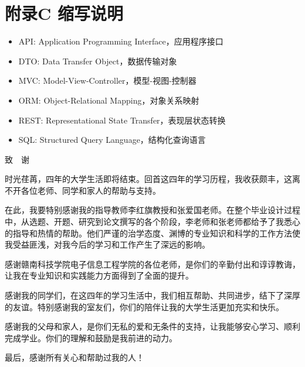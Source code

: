 \documentclass[a4paper,12pt,openany,twoside]{ctexbook}
\begin{document}
\section*{附录C 缩写说明}

\begin{itemize}[leftmargin=2em,itemsep=0pt]
    \item API: Application Programming Interface，应用程序接口
    \item DTO: Data Transfer Object，数据传输对象
    \item MVC: Model-View-Controller，模型-视图-控制器
    \item ORM: Object-Relational Mapping，对象关系映射
    \item REST: Representational State Transfer，表现层状态转换
    \item SQL: Structured Query Language，结构化查询语言
\end{itemize}


\clearpage
{}
{}

\begin{center}
    {\heiti{}致~~谢}
\end{center}

时光荏苒，四年的大学生活即将结束。回首这四年的学习历程，我收获颇丰，这离不开各位老师、同学和家人的帮助与支持。

在此，我要特别感谢我的指导教师李红旗教授和张爱国老师。在整个毕业设计过程中，从选题、开题、研究到论文撰写的各个阶段，李老师和张老师都给予了我悉心的指导和热情的帮助。他们严谨的治学态度、渊博的专业知识和科学的工作方法使我受益匪浅，对我今后的学习和工作产生了深远的影响。

感谢赣南科技学院电子信息工程学院的各位老师，是你们的辛勤付出和谆谆教诲，让我在专业知识和实践能力方面得到了全面的提升。

感谢我的同学们，在这四年的学习生活中，我们相互帮助、共同进步，结下了深厚的友谊。特别感谢我的室友们，你们的陪伴让我的大学生活更加充实和快乐。

感谢我的父母和家人，是你们无私的爱和无条件的支持，让我能够安心学习、顺利完成学业。你们的理解和鼓励是我前进的动力。

最后，感谢所有关心和帮助过我的人！
\end{document}

